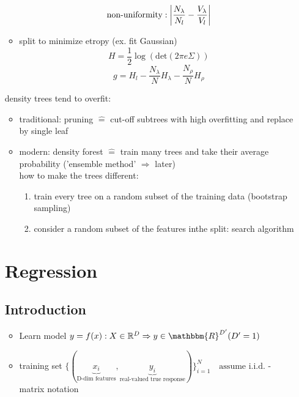 \documentclass[11pt]{article}
\DeclarePairedDelimiter\abs{\lvert}{\rvert}
\begin{document}
\begin{itemize}
\begin{itemize}
                \begin{equation*}
                  \text{non-uniformity}: \abs*{\frac{N_{\lambda}}{N_l} - \frac{V_{\lambda}}{V_l}}
                \end{equation*}
                \item split to minimize etropy (ex. fit Gaussian)
                \begin{equation*}
                  H = \frac{1}{2} \log(\text{det}(2\pi e \Sigma))
                \end{equation*}
                \begin{equation*}
                  g = H_l - \frac{N_{\lambda}}{N}H_{\lambda}-\frac{N_{\rho}}{N}H_{\rho}
                \end{equation*}
              \end{itemize}
              density trees tend to overfit:
              \begin{itemize}
                \item traditional: pruning $\widehat{=}$ cut-off subtrees with high overfitting and replace by single leaf
                \item modern: density forest $\widehat{=}$ train many trees and take their average probability ('ensemble method' $\Rightarrow$ later) \\
                how to make the trees different:
                \begin{enumerate}
                  \item train every tree on a random subset of the training data (bootstrap sampling)
                  \item consider a random subset of the features inthe split: search algorithm
                \end{enumerate}
              \end{itemize}
  \section{Regression}
    \subsection{Introduction}
      \begin{itemize}
        \item Learn model $y = f(x): X \in \mathbb{R}^D \Rightarrow y \in \mathbbm{R}^{D'} (D'=1)$
        \item training set $\{ (\underbrace{x_i}_{\text{D-dim features}}, \underbrace{y_i}_{
        \text{real-valued true response}}) \}_{i=1}^N \quad \text{assume i.i.d.} $
        - matrix notation
      \end{itemize}


\end{itemize}
\end{document}

